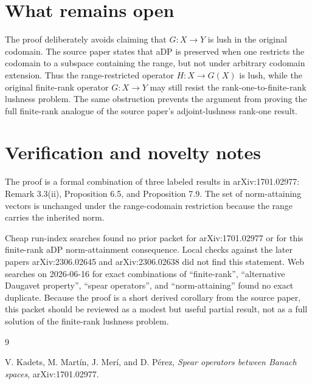 \documentclass[11pt]{article}
\begin{document}
\section*{What remains open}

The proof deliberately avoids claiming that \(G:X\to Y\) is lush in the
original codomain.  The source paper states that aDP is preserved when
one restricts the codomain to a subspace containing the range, but not
under arbitrary codomain extension.  Thus the range-restricted operator
\(H:X\to G(X)\) is lush, while the original finite-rank operator
\(G:X\to Y\) may still resist the rank-one-to-finite-rank lushness
problem.  The same obstruction prevents the argument from proving the
full finite-rank analogue of the source paper's adjoint-lushness
rank-one result.

\section*{Verification and novelty notes}

The proof is a formal combination of three labeled results in
arXiv:1701.02977: Remark 3.3(ii), Proposition 6.5, and Proposition 7.9.
The set of norm-attaining vectors is unchanged under the range-codomain
restriction because the range carries the inherited norm.

Cheap run-index searches found no prior packet for arXiv:1701.02977 or
for this finite-rank aDP norm-attainment consequence.  Local checks
against the later papers arXiv:2306.02645 and arXiv:2306.02638 did not
find this statement.  Web searches on 2026-06-16 for exact combinations
of ``finite-rank'', ``alternative Daugavet property'', ``spear
operators'', and ``norm-attaining'' found no exact duplicate.  Because
the proof is a short derived corollary from the source paper, this
packet should be reviewed as a modest but useful partial result, not as
a full solution of the finite-rank lushness problem.

\begin{thebibliography}{9}

V. Kadets, M. Mart\'in, J. Mer\'i, and D. P\'erez,
\emph{Spear operators between Banach spaces},
arXiv:1701.02977.

\end{thebibliography}
\end{document}
